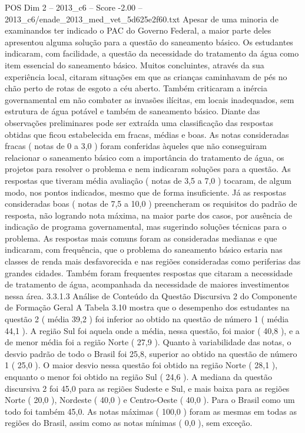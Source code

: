 \begin{textsample}{POS Dim 2 – 2013\_c6 – Score -2.00 – 2013\_c6/enade\_2013\_med\_vet\_5d625e2f60.txt}
Apesar de uma minoria de examinandos ter indicado o PAC do Governo Federal, a maior parte deles apresentou alguma solução para a questão do saneamento básico.
Os estudantes indicaram, com facilidade, a questão da necessidade do tratamento da água como item essencial do saneamento básico.
Muitos concluintes, através da sua experiência local, citaram situações em que as crianças caminhavam de pés no chão perto de rotas de esgoto a céu aberto.
Também criticaram a inércia governamental em não combater as invasões ilícitas, em locais inadequados, sem estrutura de água potável e também de saneamento básico.
Diante das observações preliminares pode ser extraída uma classificação das respostas obtidas que ficou estabelecida em fracas, médias e boas.
As notas consideradas fracas ( notas de 0 a 3,0 ) foram conferidas àqueles que não conseguiram relacionar o saneamento básico com a importância do tratamento de água, os projetos para resolver o problema e nem indicaram soluções para a questão.
As respostas que tiveram média avaliação ( notas de 3,5 a 7,0 ) tocaram, de algum modo, nos pontos indicados, mesmo que de forma insuficiente.
Já as respostas consideradas boas ( notas de 7,5 a 10,0 ) preencheram os requisitos do padrão de resposta, não logrando nota máxima, na maior parte dos casos, por ausência de indicação de programa governamental, mas sugerindo soluções técnicas para o problema.
As respostas mais comuns foram as consideradas medianas e que indicaram, com frequência, que o problema do saneamento básico estaria nas classes de renda mais desfavorecida e nas regiões consideradas como periferias das grandes cidades.
Também foram frequentes respostas que citaram a necessidade de tratamento de água, acompanhada da necessidade de maiores investimentos nessa área. 3.3.1.3 Análise de Conteúdo da Questão Discursiva 2 do Componente de Formação Geral A Tabela 3.10 mostra que o desempenho dos estudantes na questão 2 ( média 39,2 ) foi inferior ao obtido na questão de número 1 ( média 44,1 ).
A região Sul foi aquela onde a média, nessa questão, foi maior ( 40,8 ), e a de menor média foi a região Norte ( 27,9 ).
Quanto à variabilidade das notas, o desvio padrão de todo o Brasil foi 25,8, superior ao obtido na questão de número 1 ( 25,0 ).
O maior desvio nessa questão foi obtido na região Norte ( 28,1 ), enquanto o menor foi obtido na região Sul ( 24,6 ).
A mediana da questão discursiva 2 foi 45,0 para as regiões Sudeste e Sul, e mais baixa para as regiões Norte ( 20,0 ), Nordeste ( 40,0 ) e Centro-Oeste ( 40,0 ).
Para o Brasil como um todo foi também 45,0.
As notas máximas ( 100,0 ) foram as mesmas em todas as regiões do Brasil, assim como as notas mínimas ( 0,0 ), sem exceção.

\end{textsample}
